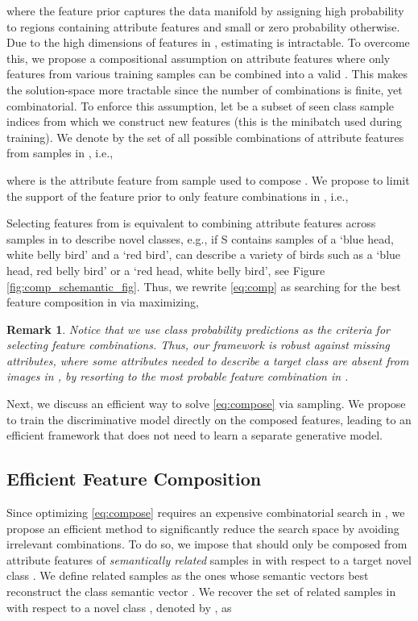 \documentclass[10pt,journal,compsoc]{IEEEtran}
\newcommand{\1}{\boldsymbol{1}}
\newcommand{\0}{\boldsymbol{0}}
\newcommand{\<}{\langle}
\renewcommand{\>}{\rangle}
\newtheorem{remark}{Remark}
\begin{document}
where the feature prior  captures the data manifold by assigning high probability to regions containing attribute features and small or zero probability otherwise. Due to the high dimensions of features in , estimating  is intractable. To overcome this, we propose a compositional assumption on attribute features where only features  from various training samples can be combined into a valid . This makes the solution-space more tractable since the number of combinations is finite, yet combinatorial. To enforce this assumption, let  be a subset of seen class sample indices from which we construct new features (this is the minibatch used during training). We denote by  the set of all possible combinations of attribute features from samples in , i.e., 

where  is the  attribute feature from sample  used to compose .
We propose to limit the support of the feature prior to only feature combinations in , i.e., 

Selecting features from  is equivalent to combining attribute features across samples in  to describe novel classes, e.g., if S contains samples of a `blue head, white belly bird' and a `red bird',  can describe a variety of birds such as a `blue head, red belly bird' or a `red head, white belly bird', see Figure \ref{fig:comp_schemantic_fig}. Thus, we rewrite \eqref{eq:comp} as searching for the best feature composition in  via maximizing,


\begin{remark}
Notice that we use class probability predictions as the criteria for selecting feature combinations. Thus, our framework is robust against missing attributes, where some attributes needed to describe a target class are absent from images in , by resorting to the most probable feature combination  in .
\end{remark} 

Next, we discuss an efficient way to solve \eqref{eq:compose} via sampling. We propose to train the discriminative model directly on the composed features, leading to an efficient framework that does not need to learn a separate generative model.

\subsection{Efficient Feature Composition}
Since optimizing \eqref{eq:compose} requires an expensive combinatorial search in , we propose an efficient method to significantly reduce the search space by avoiding irrelevant combinations. To do so, we impose that  should only be composed from attribute features of \emph{semantically related} samples in  with respect to a target novel class . We define related samples as the ones whose semantic vectors best reconstruct the class semantic vector . We recover the set of related samples in  with respect to a novel class , denoted by , as
\end{document}
